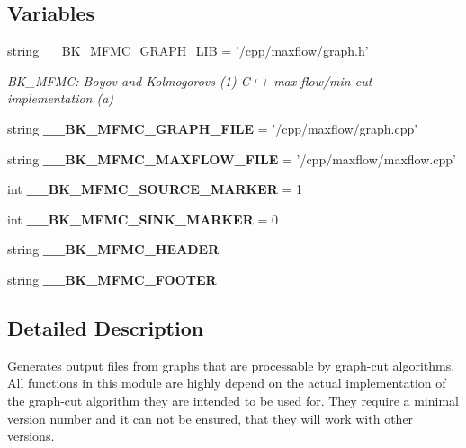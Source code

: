 \subsection*{Variables}
\begin{DoxyCompactItemize}
\item 
\hypertarget{namespacemedpy_1_1graphcut_1_1generate_aaddaff4f3365c3cb13949a2ecddc7066}{
string \hyperlink{namespacemedpy_1_1graphcut_1_1generate_aaddaff4f3365c3cb13949a2ecddc7066}{\_\-\_\-BK\_\-MFMC\_\-GRAPH\_\-LIB} = '/cpp/maxflow/graph.h'}
\label{namespacemedpy_1_1graphcut_1_1generate_aaddaff4f3365c3cb13949a2ecddc7066}

\begin{DoxyCompactList}\small\item\em BK\_\-MFMC: Boyov and Kolmogorovs (1) C++ max-\/flow/min-\/cut implementation (a) \end{DoxyCompactList}\item 
\hypertarget{namespacemedpy_1_1graphcut_1_1generate_a4f682968481d59ec21b24ecf1e7dc163}{
string {\bfseries \_\-\_\-BK\_\-MFMC\_\-GRAPH\_\-FILE} = '/cpp/maxflow/graph.cpp'}
\label{namespacemedpy_1_1graphcut_1_1generate_a4f682968481d59ec21b24ecf1e7dc163}

\item 
\hypertarget{namespacemedpy_1_1graphcut_1_1generate_aa19c09ba323f9714bea465ee57076b47}{
string {\bfseries \_\-\_\-BK\_\-MFMC\_\-MAXFLOW\_\-FILE} = '/cpp/maxflow/maxflow.cpp'}
\label{namespacemedpy_1_1graphcut_1_1generate_aa19c09ba323f9714bea465ee57076b47}

\item 
\hypertarget{namespacemedpy_1_1graphcut_1_1generate_a921090f034e86c356c56604193fca130}{
int {\bfseries \_\-\_\-BK\_\-MFMC\_\-SOURCE\_\-MARKER} = 1}
\label{namespacemedpy_1_1graphcut_1_1generate_a921090f034e86c356c56604193fca130}

\item 
\hypertarget{namespacemedpy_1_1graphcut_1_1generate_aee4d16ae8712edb67e48d79b608818ff}{
int {\bfseries \_\-\_\-BK\_\-MFMC\_\-SINK\_\-MARKER} = 0}
\label{namespacemedpy_1_1graphcut_1_1generate_aee4d16ae8712edb67e48d79b608818ff}

\item 
string {\bfseries \_\-\_\-BK\_\-MFMC\_\-HEADER}
\item 
string {\bfseries \_\-\_\-BK\_\-MFMC\_\-FOOTER}
\end{DoxyCompactItemize}


\subsection{Detailed Description}
Generates output files from graphs that are processable by graph-\/cut algorithms. All functions in this module are highly depend on the actual implementation of the graph-\/cut algorithm they are intended to be used for. They require a minimal version number and it can not be ensured, that they will work with other versions.

